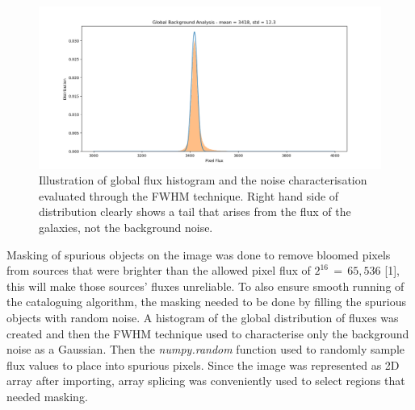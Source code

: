 \documentclass[journal]{IEEEtran}
\begin{document}
\begin{figure}[H]
    \centering
    \includegraphics[width = \linewidth]{Figure_5.png}
    \caption{Illustration of global flux histogram and the noise characterisation evaluated through the FWHM technique. Right hand side of distribution clearly shows a tail that arises from the flux of the galaxies, not the background noise.}
    \label{fig:3}
\end{figure}

\noindent Masking of spurious objects on the image was done to remove bloomed pixels from sources that were brighter than the allowed pixel flux of $2^{16}\,=\,65,536$ [1], this will make those sources' fluxes unreliable. To also ensure smooth running of the cataloguing algorithm, the masking needed to be done by filling the spurious objects with random noise. A histogram of the global distribution of fluxes was created and then the FWHM technique used to characterise only the background noise as a Gaussian. Then the \textit{numpy.random} function used to randomly sample flux values to place into spurious pixels. Since the image was represented as 2D array after importing, array splicing was conveniently used to select regions that needed masking.\newline
\end{document}
